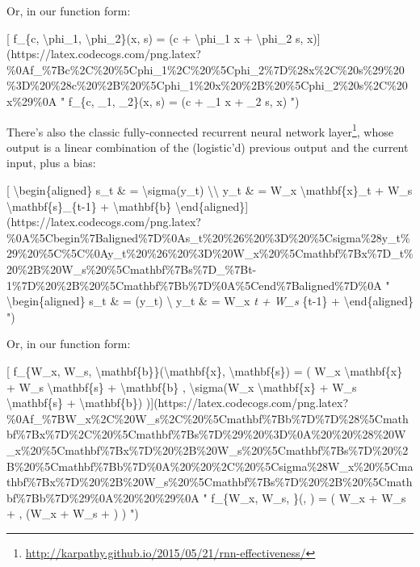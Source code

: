 \documentclass[]{article}
\renewcommand{\href}[2]{#2\footnote{\url{#1}}}
\begin{document}
Or, in our function form:

{[} f\_\{c, \textbackslash{}phi\_1, \textbackslash{}phi\_2\}(x, s) = (c +
\textbackslash{}phi\_1 x + \textbackslash{}phi\_2 s,
x){]}(https://latex.codecogs.com/png.latex?\%0Af\_\%7Bc\%2C\%20\%5Cphi\_1\%2C\%20\%5Cphi\_2\%7D\%28x\%2C\%20s\%29\%20\%3D\%20\%28c\%20\%2B\%20\%5Cphi\_1\%20x\%20\%2B\%20\%5Cphi\_2\%20s\%2C\%20x\%29\%0A
" f\_\{c, \phi\_1, \phi\_2\}(x, s) = (c + \phi\_1 x + \phi\_2 s, x) ")

There's also the classic
\href{http://karpathy.github.io/2015/05/21/rnn-effectiveness/}{fully-connected
recurrent neural network layer}, whose output is a linear combination of the
(logistic'd) previous output and the current input, plus a bias:

{[} \textbackslash{}begin\{aligned\} s\_t \& = \textbackslash{}sigma(y\_t)
\textbackslash{}\textbackslash{} y\_t \& = W\_x \textbackslash{}mathbf\{x\}\_t +
W\_s \textbackslash{}mathbf\{s\}\_\{t-1\} + \textbackslash{}mathbf\{b\}
\textbackslash{}end\{aligned\}{]}(https://latex.codecogs.com/png.latex?\%0A\%5Cbegin\%7Baligned\%7D\%0As\_t\%20\%26\%20\%3D\%20\%5Csigma\%28y\_t\%29\%20\%5C\%5C\%0Ay\_t\%20\%26\%20\%3D\%20W\_x\%20\%5Cmathbf\%7Bx\%7D\_t\%20\%2B\%20W\_s\%20\%5Cmathbf\%7Bs\%7D\_\%7Bt-1\%7D\%20\%2B\%20\%5Cmathbf\%7Bb\%7D\%0A\%5Cend\%7Baligned\%7D\%0A
" \textbackslash{}begin\{aligned\} s\_t \& = \sigma(y\_t) \textbackslash{} y\_t
\& = W\_x \emph{t + W\_s }\{t-1\} + 
\textbackslash{}end\{aligned\} ")

Or, in our function form:

{[} f\_\{W\_x, W\_s, \textbackslash{}mathbf\{b\}\}(\textbackslash{}mathbf\{x\},
\textbackslash{}mathbf\{s\}) = ( W\_x \textbackslash{}mathbf\{x\} + W\_s
\textbackslash{}mathbf\{s\} + \textbackslash{}mathbf\{b\} ,
\textbackslash{}sigma(W\_x \textbackslash{}mathbf\{x\} + W\_s
\textbackslash{}mathbf\{s\} + \textbackslash{}mathbf\{b\})
){]}(https://latex.codecogs.com/png.latex?\%0Af\_\%7BW\_x\%2C\%20W\_s\%2C\%20\%5Cmathbf\%7Bb\%7D\%7D\%28\%5Cmathbf\%7Bx\%7D\%2C\%20\%5Cmathbf\%7Bs\%7D\%29\%20\%3D\%0A\%20\%20\%28\%20W\_x\%20\%5Cmathbf\%7Bx\%7D\%20\%2B\%20W\_s\%20\%5Cmathbf\%7Bs\%7D\%20\%2B\%20\%5Cmathbf\%7Bb\%7D\%0A\%20\%20\%2C\%20\%5Csigma\%28W\_x\%20\%5Cmathbf\%7Bx\%7D\%20\%2B\%20W\_s\%20\%5Cmathbf\%7Bs\%7D\%20\%2B\%20\%5Cmathbf\%7Bb\%7D\%29\%0A\%20\%20\%29\%0A
" f\_\{W\_x, W\_s, \}(, ) = ( W\_x  +
W\_s  +  , \sigma(W\_x  + W\_s  +
) ) ")
\end{document}
